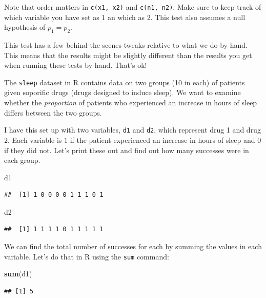 \documentclass[
]{book}
\newenvironment{Shaded}{\begin{snugshade}}{\end{snugshade}}
\newcommand{\FunctionTok}[1]{\textcolor[rgb]{0.13,0.29,0.53}{\textbf{#1}}}
\newcommand{\NormalTok}[1]{#1}
\begin{document}
Note that order matters in \texttt{c(x1,\ x2)} and \texttt{c(n1,\ n2)}. Make sure to keep track of which variable you have set as 1 an which as 2. This test also assumes a null hypothesis of \(p_1 = p_2\).

This test has a few behind-the-scenes tweaks relative to what we do by hand. This means that the results might be slightly different than the results you get when running these tests by hand. That's ok!

The \texttt{sleep} dataset in R contains data on two groups (10 in each) of patients given soporific drugs (drugs designed to induce sleep). We want to examine whether the \emph{proportion} of patients who experienced an increase in hours of sleep differs between the two groups.

I have this set up with two variables, \texttt{d1} and \texttt{d2}, which represent drug 1 and drug 2. Each variable is \(1\) if the patient experienced an increase in hours of sleep and \(0\) if they did not. Let's print these out and find out how many successes were in each group.

\begin{Shaded}
\begin{Highlighting}[]
\NormalTok{d1}
\end{Highlighting}
\end{Shaded}

\begin{verbatim}
##  [1] 1 0 0 0 0 1 1 1 0 1
\end{verbatim}

\begin{Shaded}
\begin{Highlighting}[]
\NormalTok{d2}
\end{Highlighting}
\end{Shaded}

\begin{verbatim}
##  [1] 1 1 1 1 0 1 1 1 1 1
\end{verbatim}

We can find the total number of successes for each by summing the values in each variable. Let's do that in R using the \texttt{sum} command:

\begin{Shaded}
\begin{Highlighting}[]
\FunctionTok{sum}\NormalTok{(d1)}
\end{Highlighting}
\end{Shaded}

\begin{verbatim}
## [1] 5
\end{verbatim}
\end{document}
